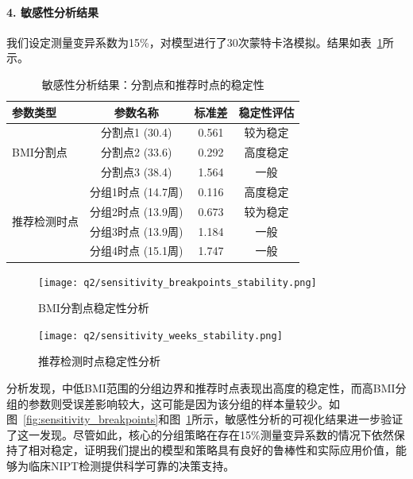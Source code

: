 \documentclass[12pt,a4paper]{ctexart}
\numberwithin{equation}{section}
\theoremstyle{mcm}
\begin{document}
\paragraph{4. 敏感性分析结果}
我们设定测量变异系数为15\%，对模型进行了30次蒙特卡洛模拟。结果如表~\ref{tab:sensitivity_analysis}所示。

\begin{table}[htbp]
\centering
\caption{敏感性分析结果：分割点和推荐时点的稳定性}
\label{tab:sensitivity_analysis}
\begin{tabular}{lccc}
\toprule
参数类型 & 参数名称 & 标准差 & 稳定性评估 \\
\midrule
\multirow{3}{*}{BMI分割点} & 分割点1 (30.4) & 0.561 & 较为稳定 \\
                         & 分割点2 (33.6) & 0.292 & 高度稳定 \\
                         & 分割点3 (38.4) & 1.564 & 一般 \\
\midrule
\multirow{4}{*}{推荐检测时点} & 分组1时点 (14.7周) & 0.116 & 高度稳定 \\
                            & 分组2时点 (13.9周) & 0.673 & 较为稳定 \\
                            & 分组3时点 (13.9周) & 1.184 & 一般 \\
                            & 分组4时点 (15.1周) & 1.747 & 一般 \\
\bottomrule
\end{tabular}
\end{table}

\begin{figure}[htbp]
    \centering
    \begin{minipage}{0.48\textwidth}
        \centering
        \texttt{[image: q2/sensitivity\_breakpoints\_stability.png]}
        \caption{BMI分割点稳定性分析}
        \label{fig:sensitivity_breakpoints}
    \end{minipage}
    \hfill
    \begin{minipage}{0.48\textwidth}
        \centering
        \texttt{[image: q2/sensitivity\_weeks\_stability.png]}
        \caption{推荐检测时点稳定性分析}
        \label{fig:sensitivity_weeks}
    \end{minipage}
\end{figure}

分析发现，中低BMI范围的分组边界和推荐时点表现出高度的稳定性，而高BMI分组的参数则受误差影响较大，这可能是因为该分组的样本量较少。如图~\ref{fig:sensitivity_breakpoints}和图~\ref{fig:sensitivity_weeks}所示，敏感性分析的可视化结果进一步验证了这一发现。尽管如此，核心的分组策略在存在15\%测量变异系数的情况下依然保持了相对稳定，证明我们提出的模型和策略具有良好的鲁棒性和实际应用价值，能够为临床NIPT检测提供科学可靠的决策支持。
\end{document}
